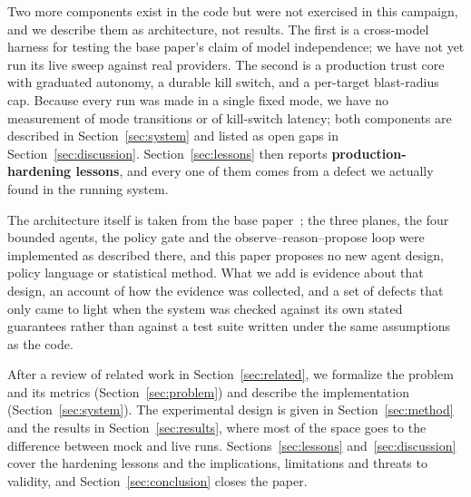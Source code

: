 Two more components exist in the code but were not exercised in this campaign, and we describe them
as architecture, not results. The first is a cross-model harness for testing the base paper's claim
of model independence; we have not yet run its live sweep against real providers. The second is a
production trust core with graduated autonomy, a durable kill switch, and a per-target blast-radius
cap. Because every run was made in a single fixed mode, we have no measurement of mode transitions
or of kill-switch latency; both components are described in Section~\ref{sec:system} and listed as
open gaps in Section~\ref{sec:discussion}. Section~\ref{sec:lessons} then reports
\textbf{production-hardening lessons}, and every one of them comes from a defect we actually found in
the running system.

The architecture itself is taken from the base paper~\cite{kirubakaran2025governing}; the three
planes, the four bounded agents, the policy gate and the observe--reason--propose loop were
implemented as described there, and this paper proposes no new agent design, policy language or
statistical method. What we add is evidence about that design, an account of how the evidence was
collected, and a set of defects that only came to light when the system was checked against its own
stated guarantees rather than against a test suite written under the same assumptions as the code.

After a review of related work in Section~\ref{sec:related}, we formalize the problem and its
metrics (Section~\ref{sec:problem}) and describe the implementation (Section~\ref{sec:system}). The
experimental design is given in Section~\ref{sec:method} and the results in
Section~\ref{sec:results}, where most of the space goes to the difference between mock and live
runs. Sections~\ref{sec:lessons} and~\ref{sec:discussion} cover the hardening lessons and the
implications, limitations and threats to validity, and Section~\ref{sec:conclusion} closes the paper.
